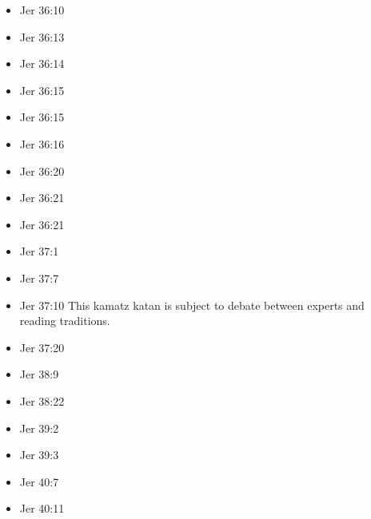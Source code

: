 \documentclass[14pt]{book}
\begin{document}
\begin{multicols}{2}
\begin{itemize}
								\item Jer 36:10
								
								\item Jer 36:13
								
								\item Jer 36:14
								
								\item Jer 36:15
								
								\item Jer 36:15
								
								\item Jer 36:16
								
								\item Jer 36:20
								
								\item Jer 36:21
								
								\item Jer 36:21
								
								\item Jer 37:1
								
								\item Jer 37:7
								
								\item Jer 37:10 This kamatz katan is subject to debate between experts and reading traditions.
								
								\item Jer 37:20
								
								\item Jer 38:9
								
								\item Jer 38:22
								
								\item Jer 39:2
								
								\item Jer 39:3
								
								\item Jer 40:7
								
								\item Jer 40:11
								

\end{itemize}
\end{multicols}
\end{document}
